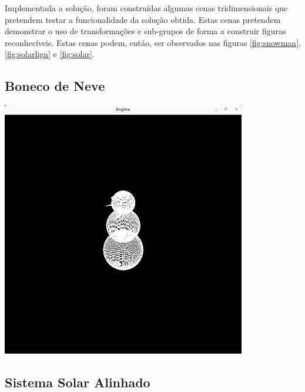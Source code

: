 Implementada a solução, foram construídas algumas cenas
tridimensionais que pretendem testar a funcionalidade
da solução obtida.
\newline
\break
\noindent
Estas cenas pretendem demonstrar o uso de transformações
e sub-grupos de forma a construir figuras reconhecíveis.
\newline
\break
\noindent
Estas cenas podem, então, ser observados nas figuras
\ref{fig:snowman}, \ref{fig:solarlign} e \ref{fig:solar}.

\subsection{Boneco de Neve}

\begin{center}
    \includegraphics[width=0.8\textwidth]{imgs/boneconeve.png}
    \label{fig:snowman}
\end{center}

\subsection{Sistema Solar Alinhado}

